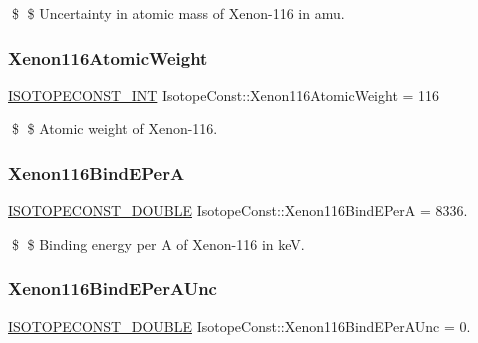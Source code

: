 \$ \$ Uncertainty in atomic mass of Xenon-\/116 in amu. \mbox{\label{group___isotope_const-_xenon-_xe116_gab4c5485d08eb8955ff1ba14953ae84a6}} 
\subsubsection{\texorpdfstring{Xenon116\+Atomic\+Weight}{Xenon116AtomicWeight}}
{\footnotesize\ttfamily \mbox{\hyperlink{group___isotope_const-_macros_ga5f18360b3e99483a35c32d789e62621c}{I\+S\+O\+T\+O\+P\+E\+C\+O\+N\+S\+T\+\_\+\+I\+NT}} Isotope\+Const\+::\+Xenon116\+Atomic\+Weight = 116}

\$ \$ Atomic weight of Xenon-\/116. \mbox{\label{group___isotope_const-_xenon-_xe116_gaf289a0be7e99664c83759121f6842895}} 
\subsubsection{\texorpdfstring{Xenon116\+Bind\+E\+PerA}{Xenon116BindEPerA}}
{\footnotesize\ttfamily \mbox{\hyperlink{group___isotope_const-_macros_ga8f45a7272ce02c0b4c65c44636ed719a}{I\+S\+O\+T\+O\+P\+E\+C\+O\+N\+S\+T\+\_\+\+D\+O\+U\+B\+LE}} Isotope\+Const\+::\+Xenon116\+Bind\+E\+PerA = 8336.}

\$ \$ Binding energy per A of Xenon-\/116 in keV. \mbox{\label{group___isotope_const-_xenon-_xe116_ga26180eff1716c9e5cc94e70ee0c9148d}} 
\subsubsection{\texorpdfstring{Xenon116\+Bind\+E\+Per\+A\+Unc}{Xenon116BindEPerAUnc}}
{\footnotesize\ttfamily \mbox{\hyperlink{group___isotope_const-_macros_ga8f45a7272ce02c0b4c65c44636ed719a}{I\+S\+O\+T\+O\+P\+E\+C\+O\+N\+S\+T\+\_\+\+D\+O\+U\+B\+LE}} Isotope\+Const\+::\+Xenon116\+Bind\+E\+Per\+A\+Unc = 0.}

